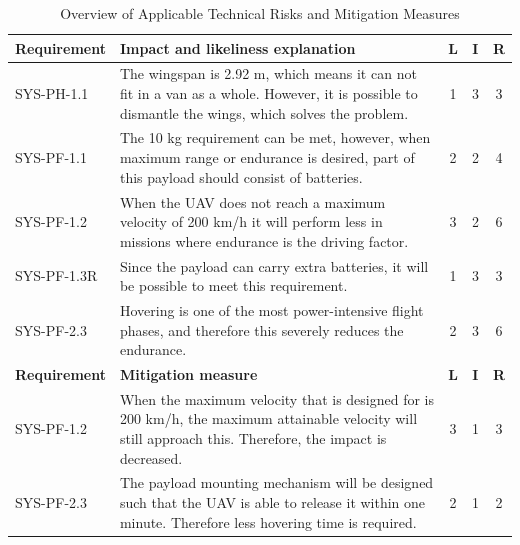 \begin{table}[ht]
    \centering
    \caption{Overview of Applicable Technical Risks and Mitigation Measures}
    \label{tab:over_tech_risk}
    \begin{tabularx}{\textwidth}{>{\small}l L *{3}{>{\small}c} }
    \toprule
    \bfseries Requirement &\bfseries Impact and likeliness explanation &\bfseries L &\bfseries I &\bfseries R
    \\ \midrule
    SYS-PH-1.1  & The wingspan is 2.92 m, which means it can not fit in a van as a whole. However, it is possible to dismantle the wings, which solves the problem.    & 1 & 3 & 3
    \\ \hdashline
    SYS-PF-1.1  & The 10 kg requirement can be met, however, when maximum range or endurance is desired, part of this payload should consist of batteries.               & 2 & 2 & 4
    \\ \hdashline
    SYS-PF-1.2  & When the UAV does not reach a maximum velocity of 200 km/h it will perform less in missions where endurance is the driving factor.     & 3 & 2 & 6
    \\ \hdashline
    SYS-PF-1.3R  & Since the payload can carry extra batteries, it will be possible to meet this requirement. & 1 & 3 & 3
    \\ \hdashline 
    SYS-PF-2.3   & Hovering is one of the most power-intensive flight phases, and therefore this severely reduces the endurance.          & 2 & 3 & 6
    \\ \toprule
    \bfseries Requirement & \bfseries Mitigation measure   & \bfseries L &\bfseries I &\bfseries R
    \\ \midrule
    SYS-PF-1.2  & When the maximum velocity that is designed for is 200 km/h, the maximum attainable velocity will still approach this. Therefore, the impact is decreased.         & 3 & 1 & 3
    \\ \hdashline
    SYS-PF-2.3 & The payload mounting mechanism will be designed such that the UAV is able to release it within one minute. Therefore less hovering time is required.             & 2 & 1 & 2
    \\ \bottomrule
    \end{tabularx}
\end{table}


